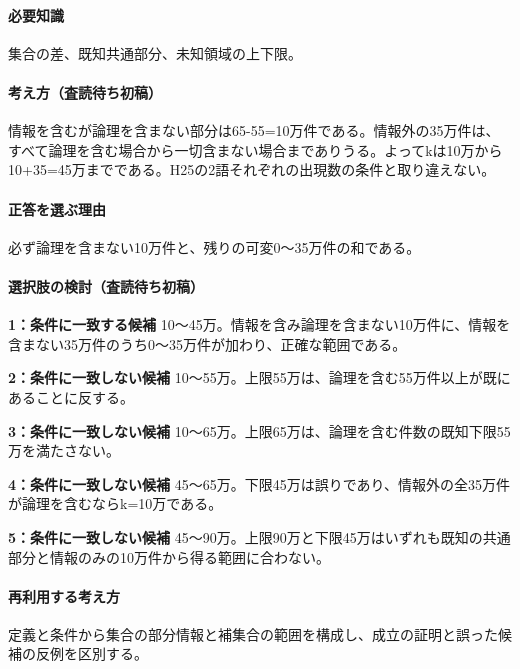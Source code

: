 \paragraph{必要知識} 集合の差、既知共通部分、未知領域の上下限。

\paragraph{考え方（査読待ち初稿）} 情報を含むが論理を含まない部分は65-55=\allowbreak{}10万件である。情報外の35万件は、すべて論理を含む場合から一切含まない場合までありうる。よってkは10万から10+35=\allowbreak{}45万までである。H25の2語それぞれの出現数の条件と取り違えない。

\paragraph{正答を選ぶ理由} 必ず論理を含まない10万件と、残りの可変0〜35万件の和である。

\paragraph{選択肢の検討（査読待ち初稿）}\mbox{}\par

\noindent\textbf{1：条件に一致する候補} 10〜45万。情報を含み論理を含まない10万件に、情報を含まない35万件のうち0〜35万件が加わり、正確な範囲である。\par

\noindent\textbf{2：条件に一致しない候補} 10〜55万。上限55万は、論理を含む55万件以上が既にあることに反する。\par

\noindent\textbf{3：条件に一致しない候補} 10〜65万。上限65万は、論理を含む件数の既知下限55万を満たさない。\par

\noindent\textbf{4：条件に一致しない候補} 45〜65万。下限45万は誤りであり、情報外の全35万件が論理を含むならk=\allowbreak{}10万である。\par

\noindent\textbf{5：条件に一致しない候補} 45〜90万。上限90万と下限45万はいずれも既知の共通部分と情報のみの10万件から得る範囲に合わない。\par

\paragraph{再利用する考え方} 定義と条件から集合の部分情報と補集合の範囲を構成し、成立の証明と誤った候補の反例を区別する。


